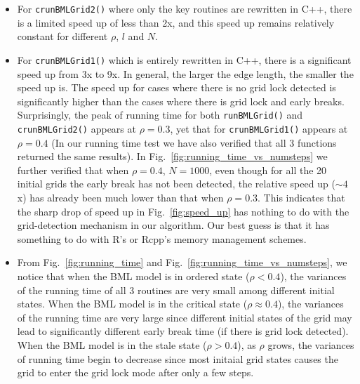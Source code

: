 \documentclass{article}
\begin{document}
\begin{itemize}
    \item For \texttt{crunBMLGrid2()} where only the key routines are rewritten
    in C++, there is a limited speed up of less than 2x, and this speed up
    remains relatively constant for different $\rho$, $l$ and $N$.
    \item For \texttt{crunBMLGrid1()} which is entirely rewritten in C++, there
    is a significant speed up from 3x to 9x. In general, the larger the edge
    length, the smaller the speed up is. The speed up for cases where there is
    no grid lock detected is significantly higher than the cases where there is
    grid lock and early breaks. Surprisingly, the peak of running time for both
    \texttt{runBMLGrid()} and \texttt{crunBMLGrid2()} appears at $\rho = 0.3$,
    yet that for \texttt{crunBMLGrid1()} appears at $\rho = 0.4$ (In our
    running time test we have also verified that all 3 functions returned the
    same results). In Fig.~\ref{fig:running_time_vs_numsteps} we further
    verified that when $\rho = 0.4$, $N=1000$, even though for all the 20
    initial grids the early break has not been detected, the relative speed up
    ($\sim4$x) has already been much lower than that when $\rho = 0.3$. This
    indicates that the sharp drop of speed up in Fig.~\ref{fig:speed_up} has
    nothing to do with the grid-detection mechanism in our algorithm. Our best
    guess is that it has something to do with R's or Rcpp's memory management
    schemes.
    \item From Fig.~\ref{fig:running_time}
    and Fig.~\ref{fig:running_time_vs_numsteps}, we notice that when the BML
    model is in ordered state ($\rho < 0.4$), the variances of the running time
    of all 3 routines are very small among different initial states. When the
    BML model is in the critical state ($\rho \approx 0.4$), the variances of
    the running time are very large since different initial states of the grid
    may lead to significantly different early break time (if there is grid lock
    detected). When the BML model is in the stale state ($\rho > 0.4$), as
    $\rho$ grows, the variances of running time begin to decrease since most
    initaial grid states causes the grid to enter the grid lock mode after only
    a few steps.
\end{itemize}
\end{document}
